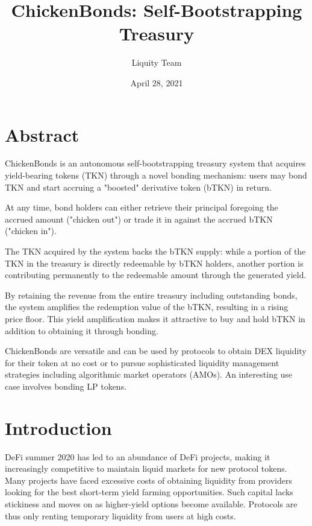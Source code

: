 \documentclass{article}
\begin{document}
\title{\textbf{ChickenBonds: Self-Bootstrapping Treasury}}
\author{Liquity Team}
\date{April 28, 2021}

\maketitle

\section*{Abstract}
ChickenBonds is an autonomous self-bootstrapping treasury system that acquires yield-bearing tokens (TKN) through a novel bonding mechanism: users may bond TKN and start accruing a "boosted" derivative token (bTKN) in return.

At any time, bond holders can either retrieve their principal foregoing the accrued amount ("chicken out") or trade it in against the accrued bTKN ("chicken in").

The TKN acquired by the system backs the bTKN supply: while a portion of the TKN in the treasury is directly redeemable by bTKN holders, another portion is contributing permanently to the redeemable amount through the generated yield.

By retaining the revenue from the entire treasury including outstanding bonds, the system amplifies the redemption value of the bTKN, resulting in a rising price floor. This yield amplification makes it attractive to buy and hold bTKN in addition to obtaining it through bonding. 

ChickenBonds are versatile and can be used by protocols to obtain DEX liquidity for their token at no cost or to pursue sophisticated liquidity management strategies including algorithmic market operators (AMOs). An interesting use case involves bonding LP tokens.

\tableofcontents

\section{Introduction}
DeFi summer 2020 has led to an abundance of DeFi projects, making it increasingly competitive to maintain liquid markets for new protocol tokens. Many projects have faced excessive costs of obtaining liquidity from providers looking for the best short-term yield farming opportunities. Such capital lacks stickiness and moves on as higher-yield options become available. Protocols are thus only renting temporary liquidity from users at high costs.
\end{document}
